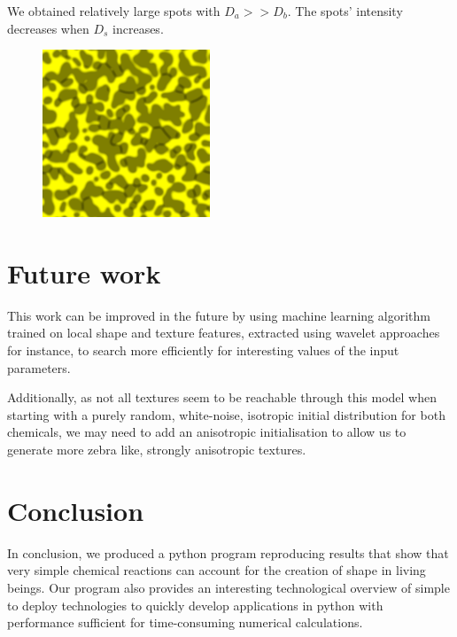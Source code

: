 \documentclass[a4paper,11pt]{article}
\begin{document}
We obtained relatively large spots with $D_a >> D_b$. The spots' intensity decreases when $D_s$ increases.

\begin{figure}[!ht]
  \centering
  \includegraphics[width=5cm]{img/spots.png}
\end{figure}



\section{Future work}

This work can be improved in the future by using machine learning algorithm
trained on local shape and texture features, extracted using wavelet
approaches for instance, to search more efficiently for interesting values of
the input parameters.

Additionally, as not all textures seem to be reachable through this model when
starting with a purely random, white-noise, isotropic initial distribution for
both chemicals, we may need to add an anisotropic initialisation to allow us
to generate more zebra like, strongly anisotropic textures.

\section{Conclusion}

In conclusion, we produced a python program reproducing results that show that
very simple chemical reactions can account for the creation of shape in living
beings. Our program also provides an interesting technological overview of
simple to deploy technologies to quickly develop applications in python with
performance sufficient for time-consuming numerical calculations.
\end{document}

